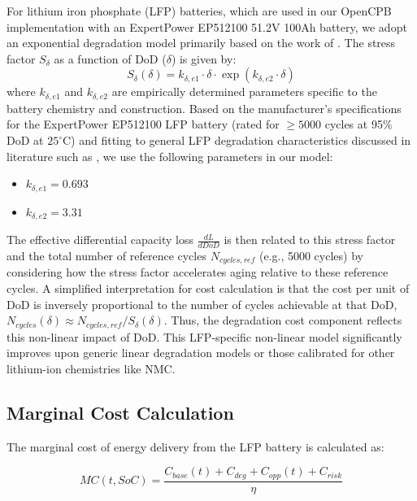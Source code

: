 \documentclass[11pt,a4paper]{article}
\begin{document}
For lithium iron phosphate (LFP) batteries, which are used in our OpenCPB implementation with an ExpertPower EP512100 51.2V 100Ah battery, we adopt an exponential degradation model primarily based on the work of \citet{Millner2010}. The stress factor $S_{\delta}$ as a function of DoD ($\delta$) is given by:
\begin{equation}
S_{\delta}(\delta) = k_{\delta,e1} \cdot \delta \cdot \exp(k_{\delta,e2} \cdot \delta)
\end{equation}
where $k_{\delta,e1}$ and $k_{\delta,e2}$ are empirically determined parameters specific to the battery chemistry and construction. Based on the manufacturer's specifications for the ExpertPower EP512100 LFP battery (rated for $\geq 5000$ cycles at  95\% DoD at $25^\circ$C) and fitting to general LFP degradation characteristics discussed in literature such as \citet{Millner2010}, we use the following parameters in our model:
\begin{itemize}
    \item $k_{\delta,e1} = 0.693$
    \item $k_{\delta,e2} = 3.31$
\end{itemize}
The effective differential capacity loss $\frac{dL}{dDoD}$ is then related to this stress factor and the total number of reference cycles $N_{cycles,ref}$ (e.g., 5000 cycles) by considering how the stress factor accelerates aging relative to these reference cycles. A simplified interpretation for cost calculation is that the cost per unit of DoD is inversely proportional to the number of cycles achievable at that DoD, $N_{cycles}(\delta) \approx N_{cycles,ref} / S_{\delta}(\delta)$. Thus, the degradation cost component reflects this non-linear impact of DoD. This LFP-specific non-linear model significantly improves upon generic linear degradation models or those calibrated for other lithium-ion chemistries like NMC.

\subsection{Marginal Cost Calculation}
The marginal cost of energy delivery from the LFP battery is calculated as:

\begin{equation}
MC(t, SoC) = \frac{C_{base}(t) + C_{deg} + C_{opp}(t) + C_{risk}}{\eta}
\end{equation}
\end{document}
